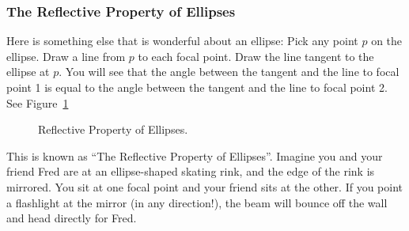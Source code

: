 \subsubsection{The Reflective Property of Ellipses}

Here is something else that is wonderful about an ellipse: Pick any
point $p$ on the ellipse. Draw a line from $p$ to each focal point.
Draw the line tangent to the ellipse at $p$. You will see that the angle between
the tangent and the line to focal point 1 is equal to the angle between the
tangent and the line to focal point 2. See Figure~\ref{fig:reflectiveEllipse}
\begin{figure}[H]
  \centering
  \caption{Reflective Property of Ellipses.}
  \label{fig:reflectiveEllipse}
\end{figure}

This is known as ``The Reflective Property of Ellipses''.
Imagine you and your friend Fred are at an ellipse-shaped skating rink, and the
edge of the rink is mirrored. You sit at one focal point and your friend
sits at the other. If you point a flashlight at the mirror (in any
direction!), the beam will bounce off the wall and head directly for
Fred.


